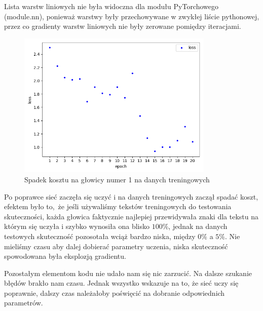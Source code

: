 Lista warstw liniowych nie była widoczna dla modułu PyTorchowego (module.nn), ponieważ warstwy były przechowywane
w zwykłej liście pythonowej, przez co gradienty warstw liniowych nie były zerowane pomiędzy iteracjami.

\begin{figure}[H]
	\centering
	\includegraphics[height=7cm]{./images/loss_decrease.png}
	\caption{Spadek kosztu na głowicy numer 1 na danych treningowych}
	\label{fig:test5}
\end{figure}

Po poprawce sieć zaczęła się uczyć i na danych treningowych zaczął spadać koszt, efektem było to, że 
jeśli używaliśmy tekstów treningowych do testowania skuteczności, każda głowica faktycznie najlepiej przewidywała
znaki dla tekstu na którym się uczyła i szybko wynosiła ona blisko $100\%$, jednak na danych testowych 
skuteczność pozosotała wciąż bardzo niska, między $0\%$ a $5\%$. Nie mieliśmy czasu aby dalej dobierać parametry uczenia,
niska skuteczność spowodowana była eksplozją gradientu. 

Pozostałym elementom kodu nie udało nam się nic zarzucić. Na dalsze szukanie błędów brakło nam czasu. 
Jednak wszystko wskazuje na to, że sieć uczy się poprawnie, dalszy czas należałoby poświęcić na dobranie odpowiednich
parametrów.
